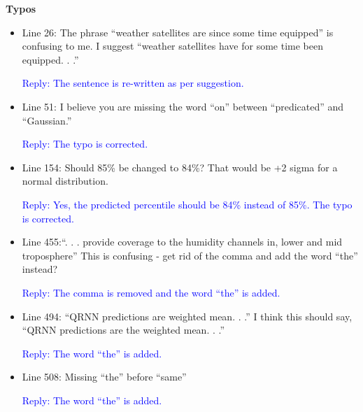 \documentclass[11pt,a4paper,draft]{article}
\begin{document}
\textbf{Typos}
\begin{itemize}


\item Line 26: The phrase ``weather satellites are since some time equipped'' is confusing to
me. I suggest ``weather satellites have for some time been equipped. . .''

\textcolor{blue}{Reply: The sentence is re-written as per suggestion.}

\item Line 51: I believe you are missing the word ``on'' between ``predicated'' and ``Gaussian.''

\textcolor{blue}{Reply: The typo is corrected.}

\item Line 154: Should 85\% be changed to 84\%? That would be +2 sigma for a normal
distribution.

\textcolor{blue}{Reply: Yes, the predicted percentile should be 84\% instead of 85\%. The typo is corrected.} 


\item Line 455:``. . . provide coverage to the humidity channels in, lower and mid troposphere''
This is confusing - get rid of the comma and add the word ``the'' instead?

\textcolor{blue}{Reply: The comma is removed and the word ``the'' is added.}


\item Line 494:	``QRNN predictions are weighted mean. . .'' I think this should say, ``QRNN
predictions are the weighted mean. . .''

\textcolor{blue}{Reply: The word ``the'' is added.}



\item Line 508: Missing ``the'' before ``same''


\textcolor{blue}{Reply: The word ``the'' is added.}

\end{itemize}
	
\end{document}
